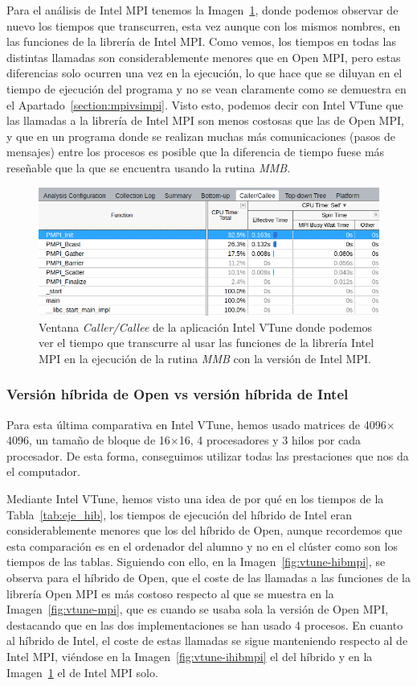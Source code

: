 \documentclass[a4paper,12pt]{article}
\begin{document}
Para el análisis de Intel MPI tenemos la Imagen~\ref{fig:vtune-impi}, donde podemos observar de nuevo los tiempos que transcurren, esta vez aunque con los mismos nombres, en las funciones de la librería de Intel MPI. Como vemos, los tiempos en todas las distintas llamadas son considerablemente menores que en Open MPI, pero estas diferencias solo ocurren una vez en la ejecución, lo que hace que se diluyan en el tiempo de ejecución del programa y no se vean claramente como se demuestra en el Apartado~\ref{section:mpivsimpi}. Visto esto, podemos decir con Intel VTune que las llamadas a la librería de Intel MPI son menos costosas que las de Open MPI, y que en un programa donde se realizan muchas más comunicaciones (pasos de mensajes) entre los procesos es posible que la  diferencia de tiempo fuese más reseñable que la que se encuentra usando la rutina {\it MMB}.

\begin{figure}[htbp]
    \includegraphics[scale=0.5]{./images/vtuneimpiTabla.png}
    \centering
    \caption{Ventana {\it Caller/Callee} de la aplicación Intel VTune donde podemos ver el tiempo que transcurre al usar las funciones de la librería Intel MPI en la ejecución de la rutina {\it MMB} con la versión de Intel MPI.}
    \label{fig:vtune-impi}
\end{figure}

\subsubsection{Versión híbrida de Open vs versión híbrida de Intel}
Para esta última comparativa en Intel VTune, hemos usado matrices de 4096$\times$4096, un tamaño de bloque de 16$\times$16, 4 procesadores y 3 hilos por cada procesador. De esta forma, conseguimos utilizar todas las prestaciones que nos da el computador.

Mediante Intel VTune, hemos visto una idea de por qué en los tiempos de la Tabla~\ref{tab:eje_hib}, los tiempos de ejecución del híbrido de Intel eran considerablemente menores que los del híbrido de Open, aunque recordemos que esta comparación es en el ordenador del alumno y no en el clúster como son los tiempos de las tablas. Siguiendo con ello, en la Imagen~\ref{fig:vtune-hibmpi}, se observa para el híbrido de Open, que el coste de las llamadas a las funciones de la librería Open MPI es más costoso respecto al que se muestra en la Imagen~\ref{fig:vtune-mpi}, que es cuando se usaba sola la versión de Open MPI, destacando que en las dos implementaciones se han usado 4 procesos. En cuanto al híbrido de Intel, el coste de estas llamadas se sigue manteniendo respecto al de Intel MPI, viéndose en la Imagen~\ref{fig:vtune-ihibmpi} el del híbrido y en la Imagen~\ref{fig:vtune-impi} el de Intel MPI solo.
\end{document}
